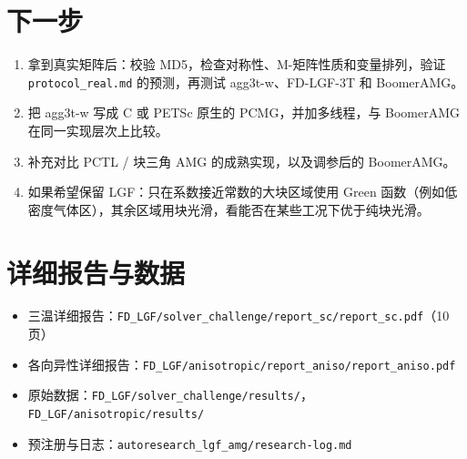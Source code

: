 \documentclass[11pt,a4paper]{ctexart}
\begin{document}
\section{下一步}
\begin{enumerate}
\item 拿到真实矩阵后：校验 MD5，检查对称性、M-矩阵性质和变量排列，验证 \texttt{protocol\_real.md} 的预测，再测试 agg3t-w、FD-LGF-3T 和 BoomerAMG。
\item 把 agg3t-w 写成 C 或 PETSc 原生的 PCMG，并加多线程，与 BoomerAMG 在同一实现层次上比较。
\item 补充对比 PCTL / 块三角 AMG 的成熟实现，以及调参后的 BoomerAMG。
\item 如果希望保留 LGF：只在系数接近常数的大块区域使用 Green 函数（例如低密度气体区），其余区域用块光滑，看能否在某些工况下优于纯块光滑。
\end{enumerate}

\section*{详细报告与数据}
\small
\begin{itemize}
\item 三温详细报告：\texttt{FD\_LGF/solver\_challenge/report\_sc/report\_sc.pdf}（10 页）
\item 各向异性详细报告：\texttt{FD\_LGF/anisotropic/report\_aniso/report\_aniso.pdf}
\item 原始数据：\texttt{FD\_LGF/solver\_challenge/results/}，\texttt{FD\_LGF/anisotropic/results/}
\item 预注册与日志：\texttt{autoresearch\_lgf\_amg/research-log.md}
\end{itemize}
\end{document}
